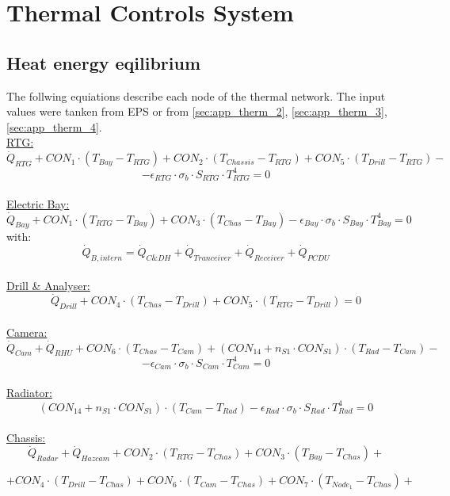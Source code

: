 \clearpage
\section{Thermal Controls System} \label{sec:AppendixThermal}
\subsection{Heat energy eqilibrium}
The follwing equiations describe each node of the thermal network.
The input values were tanken from EPS or from \autoref{sec:app_therm_2}, \autoref{sec:app_therm_3}, \autoref{sec:app_therm_4}.\\

\underline{RTG:}
\[\dot{Q}_{RTG} +CON_1 \cdot (T_{Bay}-T_{RTG})+CON_2 \cdot (T_{Chassis}-T_{RTG})+CON_5 \cdot (T_{Drill}-T_{RTG})-\]
\[ - \epsilon_{RTG}\cdot \sigma_b \cdot S_{RTG}\cdot T_{RTG}^4= 0 \]\\



\underline{Electric Bay:}
\[ \dot{Q}_{Bay}+ CON_1 \cdot (T_{RTG}-T_{Bay})+ CON_3 \cdot (T_{Chas}-T_{Bay})  -\epsilon_{Bay}\cdot \sigma_b \cdot S_{Bay}\cdot T_{Bay}^4=0 \]
with: 
\[\dot{Q}_{B,intern} = \dot{Q}_{C\&DH} + \dot{Q}_{Tranceiver} +\dot{Q}_{Receiver} +\dot{Q}_{PCDU} \] \\

\underline{Drill \& Analyser:}
\[ \dot{Q}_{Drill} +CON_4 \cdot (T_{Chas}-T_{Drill})+CON_5 \cdot (T_{RTG}-T_{Drill}) = 0  \]\\

\underline{Camera:}
\[ \dot{Q}_{Cam} + \dot{Q}_{RHU} +CON_6 \cdot (T_{Chas}-T_{Cam})+(CON_{14} +n_{S1}\cdot CON_{S1}) \cdot (T_{Rad}-T_{Cam}) -\]
\[ - \epsilon_{Cam}\cdot \sigma_b \cdot S_{Cam}\cdot T_{Cam}^4= 0  \]\\

\underline{Radiator:}
\[  (CON_{14} +n_{S1}\cdot CON_{S1}) \cdot (T_{Cam}-T_{Rad}) - \epsilon_{Rad}\cdot \sigma_b \cdot S_{Rad}\cdot T_{Rad}^4= 0  \]\\

\underline{Chassis:}
\[ \dot{Q}_{Radar}+\dot{Q}_{Hazcam}  +CON_2 \cdot (T_{RTG}-T_{Chas})+CON_3 \cdot (T_{Bay}-T_{Chas})+\]

\[+CON_4 \cdot (T_{Drill}-T_{Chas})+ CON_6 \cdot (T_{Cam}-T_{Chas})+CON_7 \cdot (T_{Node_1}-T_{Chas}) +\]

